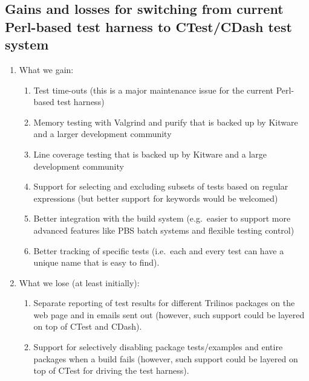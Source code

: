 \documentclass[pdf,ps2pdf,11pt]{SANDreport}
\begin{document}
%
\subsection{Gains and losses for switching from current Perl-based test
harness to CTest/CDash test system}
%

\begin{enumerate}

{}\item What we gain:

  \begin{enumerate}

  {}\item Test time-outs (this is a major maintenance issue for the
  current Perl-based test harness)

  {}\item Memory testing with Valgrind and purify that is backed up by
  Kitware and a larger development community

  {}\item Line coverage testing that is backed up by Kitware and a
  large development community

  {}\item Support for selecting and excluding subsets of tests based
  on regular expressions (but better support for keywords would be
  welcomed)

  {}\item Better integration with the build system (e.g.\ easier to
  support more advanced features like PBS batch systems and flexible
  testing control)

  {}\item Better tracking of specific tests (i.e.\ each and every test
  can have a unique name that is easy to find).

  \end{enumerate}

{}\item What we lose (at least initially):

  \begin{enumerate}

  {}\item Separate reporting of test results for different Trilinos
  packages on the web page and in emails sent out (however, such
  support could be layered on top of CTest and CDash).

  {}\item Support for selectively disabling package tests/examples and
  entire packages when a build fails (however, such support could be
  layered on top of CTest for driving the test harness).

  \end{enumerate}

\end{enumerate}
\end{document}
